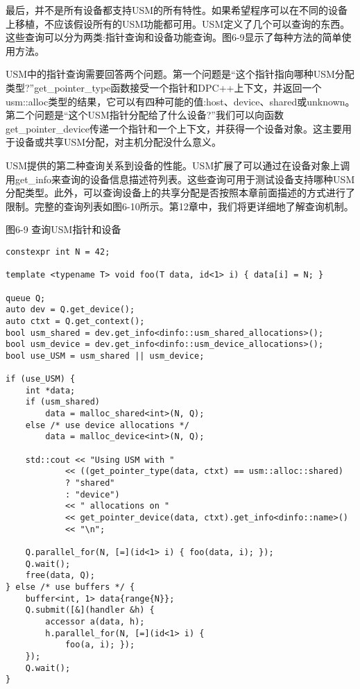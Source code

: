 最后，并不是所有设备都支持USM的所有特性。如果希望程序可以在不同的设备上移植，不应该假设所有的USM功能都可用。USM定义了几个可以查询的东西。这些查询可以分为两类:指针查询和设备功能查询。图6-9显示了每种方法的简单使用方法。\par

USM中的指针查询需要回答两个问题。第一个问题是“这个指针指向哪种USM分配类型?”get\_pointer\_type函数接受一个指针和DPC++上下文，并返回一个usm::alloc类型的结果，它可以有四种可能的值:host、device、shared或unknown。第二个问题是“这个USM指针分配给了什么设备?”我们可以向函数get\_pointer\_device传递一个指针和一个上下文，并获得一个设备对象。这主要用于设备或共享USM分配，对主机分配没什么意义。\par

USM提供的第二种查询关系到设备的性能。USM扩展了可以通过在设备对象上调用get\_info来查询的设备信息描述符列表。这些查询可用于测试设备支持哪种USM分配类型。此外，可以查询设备上的共享分配是否按照本章前面描述的方式进行了限制。完整的查询列表如图6-10所示。第12章中，我们将更详细地了解查询机制。\par

\hspace*{\fill} \par %
图6-9 查询USM指针和设备
\begin{lstlisting}[caption={}]
constexpr int N = 42;

template <typename T> void foo(T data, id<1> i) { data[i] = N; }

queue Q;
auto dev = Q.get_device();
auto ctxt = Q.get_context();
bool usm_shared = dev.get_info<dinfo::usm_shared_allocations>();
bool usm_device = dev.get_info<dinfo::usm_device_allocations>();
bool use_USM = usm_shared || usm_device;

if (use_USM) {
	int *data;
	if (usm_shared)
		data = malloc_shared<int>(N, Q);
	else /* use device allocations */
		data = malloc_device<int>(N, Q);
		
	std::cout << "Using USM with "
			<< ((get_pointer_type(data, ctxt) == usm::alloc::shared)
			? "shared"
			: "device")
			<< " allocations on "
			<< get_pointer_device(data, ctxt).get_info<dinfo::name>()
			<< "\n";
			
	Q.parallel_for(N, [=](id<1> i) { foo(data, i); });
	Q.wait();
	free(data, Q);
} else /* use buffers */ {
	buffer<int, 1> data{range{N}};
	Q.submit([&](handler &h) {
		accessor a(data, h);
		h.parallel_for(N, [=](id<1> i) {
			foo(a, i); });
	});
	Q.wait();
}
\end{lstlisting}

